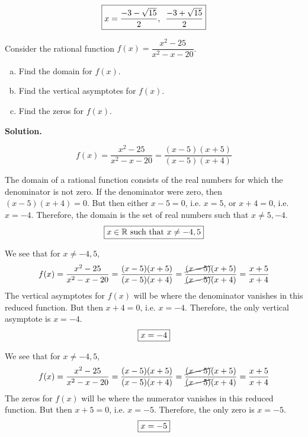 \documentclass[12pt,letterpaper]{exam}
\begin{document}
\begin{questions}
{	\[
	\boxed{x= \dfrac{-3 - \sqrt{15}}{2},\enskip \dfrac{-3 + \sqrt{15}}{2}}
	\]
}





\newpage
\question[10] Consider the rational function $f(x)= \dfrac{x^2 - 25}{x^2 - x - 20}$. 
\begin{enumerate}[(a)]
\item Find the domain for $f(x)$. 
\item Find the vertical asymptotes for $f(x)$. 
\item Find the zeros for $f(x)$. 
\end{enumerate} \pspace

{\noindent\bfseries Solution.}

	\[
	f(x)= \dfrac{x^2 - 25}{x^2 - x - 20}= \dfrac{(x - 5)(x + 5)}{(x - 5)(x + 4)}
	\] \pspace

\begin{enumerate}[(a)]
{\itshape
\item The domain of a rational function consists of the real numbers for which the denominator is not zero. If the denominator were zero, then $(x - 5)(x + 4)= 0$. But then either $x - 5= 0$, i.e. $x= 5$, or $x + 4= 0$, i.e. $x= -4$. Therefore, the domain is the set of real numbers such that $x \neq 5, -4$. 
	\[
	\boxed{%
	x \in \mathbb{R} \text{ such that } x \neq -4, 5
	}
	\] \pspace

\item We see that for $x \neq -4, 5$, 
	\[
	f(x)= \dfrac{x^2 - 25}{x^2 - x - 20}= \dfrac{(x - 5)(x + 5)}{(x - 5)(x + 4)}= \dfrac{\cancel{(x - 5)}(x + 5)}{\cancel{(x - 5)}(x + 4)}= \dfrac{x + 5}{x + 4}
	\]
The vertical asymptotes for $f(x)$ will be where the denominator vanishes in this reduced function. But then $x + 4= 0$, i.e. $x= -4$. Therefore, the only vertical asymptote is $x= -4$. 
	\[
	\boxed{%
	x= -4
	}
	\] \pspace

\item We see that for $x \neq -4, 5$, 
	\[
	f(x)= \dfrac{x^2 - 25}{x^2 - x - 20}= \dfrac{(x - 5)(x + 5)}{(x - 5)(x + 4)}= \dfrac{\cancel{(x - 5)}(x + 5)}{\cancel{(x - 5)}(x + 4)}= \dfrac{x + 5}{x + 4}
	\]
The zeros for $f(x)$ will be where the numerator vanishes in this reduced function. But then $x + 5= 0$, i.e. $x= -5$. Therefore, the only zero is $x= -5$. 
	\[
	\boxed{%
	x= -5
	}
	\] \pspace
}
\end{enumerate}






\end{questions}
\end{document}
